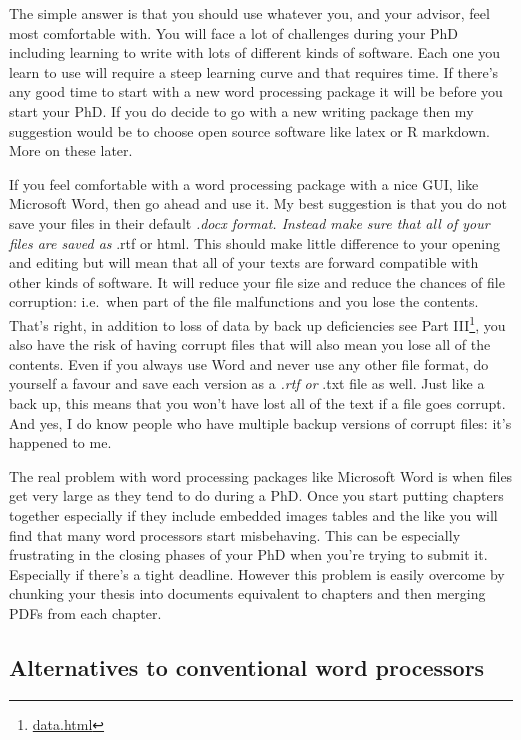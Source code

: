 \documentclass[
]{krantz}
\renewcommand{\href}[2]{#2\footnote{\url{#1}}}
\begin{document}
The simple answer is that you should use whatever you, and your advisor, feel most comfortable with. You will face a lot of challenges during your PhD including learning to write with lots of different kinds of software. Each one you learn to use will require a steep learning curve and that requires time. If there's any good time to start with a new word processing package it will be before you start your PhD. If you do decide to go with a new writing package then my suggestion would be to choose open source software like latex or R markdown. More on these later.

If you feel comfortable with a word processing package with a nice GUI, like Microsoft Word, then go ahead and use it. My best suggestion is that you do not save your files in their default \emph{.docx format. Instead make sure that all of your files are saved as }.rtf or html. This should make little difference to your opening and editing but will mean that all of your texts are forward compatible with other kinds of software. It will reduce your file size and reduce the chances of file corruption: i.e.~when part of the file malfunctions and you lose the contents. That's right, in addition to loss of data by back up deficiencies \href{data.html}{see Part III}, you also have the risk of having corrupt files that will also mean you lose all of the contents. Even if you always use Word and never use any other file format, do yourself a favour and save each version as a \emph{.rtf or }.txt file as well. Just like a back up, this means that you won't have lost all of the text if a file goes corrupt. And yes, I do know people who have multiple backup versions of corrupt files: it's happened to me.

The real problem with word processing packages like Microsoft Word is when files get very large as they tend to do during a PhD. Once you start putting chapters together especially if they include embedded images tables and the like you will find that many word processors start misbehaving. This can be especially frustrating in the closing phases of your PhD when you're trying to submit it. Especially if there's a tight deadline. However this problem is easily overcome by chunking your thesis into documents equivalent to chapters and then merging PDFs from each chapter.

\hypertarget{alternatives-to-conventional-word-processors}{%
\subsection{Alternatives to conventional word processors}\label{alternatives-to-conventional-word-processors}}
\end{document}
